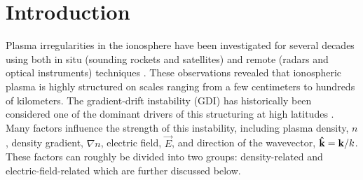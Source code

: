 %
% 
% 
% 


\section{Introduction}
\label{sec:p3intro}

Plasma irregularities in the ionosphere have been investigated for several decades using both in situ (sounding rockets and satellites) and remote (radars and optical instruments) techniques \citep[e.g. a comprehensive review by][]{Fejer1980}.  These observations revealed that ionospheric plasma is highly structured on scales ranging from a few centimeters to hundreds of kilometers.  The gradient-drift instability (GDI) has historically been considered one of the dominant drivers of this structuring at high latitudes \citep{Tsunoda1988}.  Many factors influence the strength of this instability, including plasma density, \(n\), density gradient, \(\nabla n\), electric field, \(\vec{E}\), and direction of the wavevector, \(\mathbf{\hat{k}}=\mathbf{k}/k\).  These factors can roughly be divided into two groups: density-related and electric-field-related which are further discussed below.

